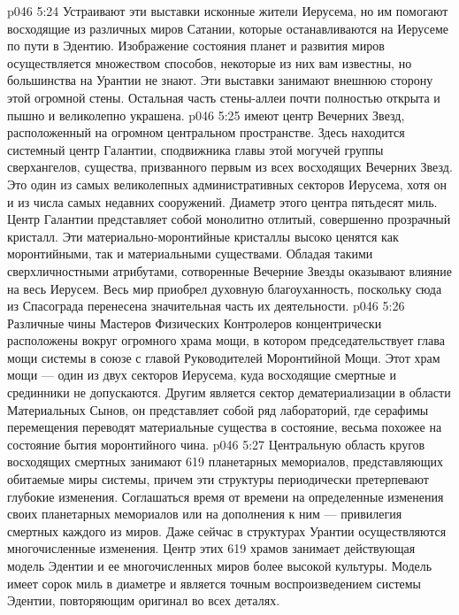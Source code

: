 \vs p046 5:24 Устраивают эти выставки исконные жители Иерусема, но им помогают восходящие из различных миров Сатании, которые останавливаются на Иерусеме по пути в Эдентию. Изображение состояния планет и развития миров осуществляется множеством способов, некоторые из них вам известны, но большинства на Урантии не знают. Эти выставки занимают внешнюю сторону этой огромной стены. Остальная часть стены\hyp{}аллеи почти полностью открыта и пышно и великолепно украшена.
\vs p046 5:25 \bibnobreakspace {} имеют центр Вечерних Звезд, расположенный на огромном центральном пространстве. Здесь находится системный центр Галантии, сподвижника главы этой могучей группы сверхангелов, существа, призванного первым из всех восходящих Вечерних Звезд. Это один из самых великолепных административных секторов Иерусема, хотя он и из числа самых недавних сооружений. Диаметр этого центра пятьдесят миль. Центр Галантии представляет собой монолитно отлитый, совершенно прозрачный кристалл. Эти материально\hyp{}моронтийные кристаллы высоко ценятся как моронтийными, так и материальными существами. Обладая такими сверхличностными атрибутами, сотворенные Вечерние Звезды оказывают влияние на весь Иерусем. Весь мир приобрел духовную благоуханность, поскольку сюда из Спасограда перенесена значительная часть их деятельности.
\vs p046 5:26 \bibnobreakspace {} Различные чины Мастеров Физических Контролеров концентрически расположены вокруг огромного храма мощи, в котором председательствует глава мощи системы в союзе с главой Руководителей Моронтийной Мощи. Этот храм мощи --- один из двух секторов Иерусема, куда восходящие смертные и срединники не допускаются. Другим является сектор дематериализации в области Материальных Сынов, он представляет собой ряд лабораторий, где серафимы перемещения переводят материальные существа в состояние, весьма похожее на состояние бытия моронтийного чина.
\vs p046 5:27 \bibnobreakspace {} Центральную область кругов восходящих смертных занимают 619 планетарных мемориалов, представляющих обитаемые миры системы, причем эти структуры периодически претерпевают глубокие изменения. Соглашаться время от времени на определенные изменения своих планетарных мемориалов или на дополнения к ним --- привилегия смертных каждого из миров. Даже сейчас в структурах Урантии осуществляются многочисленные изменения. Центр этих 619 храмов занимает действующая модель Эдентии и ее многочисленных миров более высокой культуры. Модель имеет сорок миль в диаметре и является точным воспроизведением системы Эдентии, повторяющим оригинал во всех деталях.
